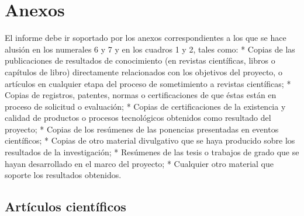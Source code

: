 \pagestyle{plain}
\newpage{}
\qquad

\newpage{}
\section{Anexos}
\begin{instrucciones}
  El informe debe ir soportado por los anexos correspondientes a los que se hace alusión en los numerales 6 y 7 y en los cuadros 1 y 2, tales como:
* Copias de las publicaciones de resultados de conocimiento (en revistas científicas, libros o capítulos de libro) directamente relacionados con los objetivos del proyecto, o artículos en cualquier etapa del proceso de sometimiento a revistas científicas; 
* Copias de registros, patentes, normas o certificaciones de que éstas están en proceso de solicitud o evaluación;
* Copias de certificaciones de la existencia y calidad de productos o procesos tecnológicos obtenidos como resultado del proyecto;
* Copias de los resúmenes de las ponencias presentadas en eventos científicos;
* Copias de otro material divulgativo que se haya producido sobre los resultados de la investigación;
* Resúmenes de las tesis o trabajos de grado que se hayan desarrollado en el marco del proyecto;
* Cualquier otro material que soporte los resultados obtenidos.
\end{instrucciones}



\subsection{Artículos científicos}
\label{sec:artic-cient}




%  



          



